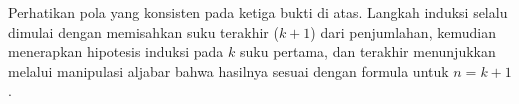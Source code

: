 \begin{konsep}
Perhatikan pola yang konsisten pada ketiga bukti di atas. Langkah induksi selalu dimulai dengan memisahkan suku terakhir ($k+1$) dari penjumlahan, kemudian menerapkan hipotesis induksi pada $k$ suku pertama, dan terakhir menunjukkan melalui manipulasi aljabar bahwa hasilnya sesuai dengan formula untuk $n = k+1$.
\end{konsep}
